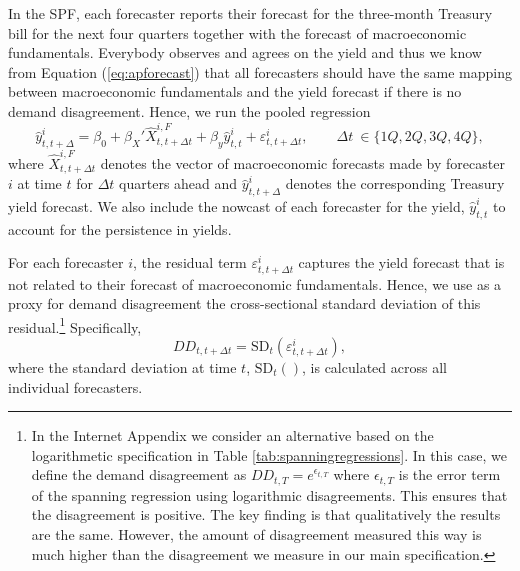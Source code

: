 \documentclass[preprint,11pt,authoryear]{elsarticle}
\theoremstyle{plain}
\begin{document}
In the SPF, each forecaster reports their forecast for the three-month Treasury bill for the next four quarters together with the forecast of macroeconomic fundamentals. Everybody observes and agrees on the yield and thus we know from Equation (\ref{eq:apforecast}) that all forecasters should have the same mapping between macroeconomic fundamentals and the yield forecast if there is no demand disagreement. Hence, we run the pooled regression
%
\begin{equation}\label{regEq1}
    \hat{y}^i_{t,t+\Delta} = \beta_0 + \beta_X' \hat{X}^{i,F}_{t,t+\Delta t} + \beta_y \hat{y}^i_{t,t} + \varepsilon^i_{t,t+\Delta t}, \qquad \Delta t\: \in \lbrace{1Q, 2Q,3Q,4Q} \rbrace,
\end{equation}
%
where $\hat{X}^{i,F}_{t,t+\Delta t}$ denotes the vector of macroeconomic forecasts made by forecaster $i$ at time $t$ for $\Delta t$ quarters ahead and $\hat{y}^i_{t,t+\Delta}$ denotes the corresponding Treasury yield forecast. We also include the nowcast of each forecaster for the yield, $\hat{y}^i_{t,t}$ to account for the persistence in yields. 

For each forecaster $i$, the residual term $\varepsilon^i_{t,t+\Delta t}$ captures the yield forecast that is not related to their forecast of macroeconomic fundamentals. Hence, we use as a proxy for demand disagreement the cross-sectional standard deviation of this residual.\footnote{In the Internet Appendix we consider an alternative based on the logarithmetic specification in Table \ref{tab:spanningregressions}. In this case, we define the demand disagreement as $DD_{t,T} = e^{\epsilon_{t,T}}$ where $\epsilon_{t,T}$ is the error term of the spanning regression using logarithmic disagreements. This ensures that the disagreement is positive. The key finding is that qualitatively the results are the same. However, the amount of disagreement measured this way is much higher than the disagreement we measure in our main specification.} Specifically, 
%
\begin{equation}\label{DD}
    DD_{t,t+ \Delta t} = \text{SD}_t \left(\varepsilon^i_{t,t+\Delta t} \right),
\end{equation}
%
where the standard deviation at time $t$, $\text{SD}_t\left(\right)$, is calculated across all individual forecasters. 
\end{document}
